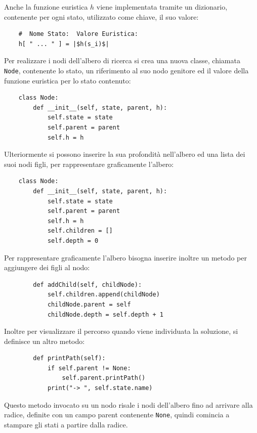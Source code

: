 \documentclass{article}
\numberwithin{equation}{subsection}
\begin{document}
Anche la funzione euristica $h$ viene implementata tramite un dizionario, contenente per ogni 
stato, utilizzato come chiave, il suo valore:
\begin{verbatim}
    #  Nome Stato:  Valore Euristica:
    h[ " ... " ] = |$h(s_i)$|
\end{verbatim}

Per realizzare i nodi dell'albero di ricerca si crea una nuova classe, chiamata \verb|Node|, 
contenente lo stato, un riferimento 
al suo nodo genitore ed il valore della funzione euristica per lo stato contenuto:
\begin{verbatim}
    class Node:
        def __init__(self, state, parent, h):
            self.state = state
            self.parent = parent
            self.h = h
\end{verbatim}

Ulteriormente si possono inserire la sua profondità nell'albero ed una lista dei suoi nodi figli, 
per rappresentare graficamente l'albero:
\begin{verbatim}
    class Node:
        def __init__(self, state, parent, h):
            self.state = state
            self.parent = parent
            self.h = h
            self.children = []
            self.depth = 0
\end{verbatim}

Per rappresentare graficamente l'albero bisogna inserire inoltre un metodo per aggiungere 
dei figli al nodo:
\begin{verbatim}
        def addChild(self, childNode):
            self.children.append(childNode)
            childNode.parent = self
            childNode.depth = self.depth + 1
\end{verbatim}

Inoltre per visualizzare il percorso quando viene individuata la soluzione, si definisce 
un altro metodo:
\begin{verbatim}
        def printPath(self):
            if self.parent != None:
                self.parent.printPath()
            print("-> ", self.state.name)
\end{verbatim}

Questo metodo invocato su un nodo risale i nodi dell'albero fino ad arrivare alla radice, 
definite con un campo parent contenente \verb|None|, quindi comincia a stampare gli 
stati a partire dalla radice. 
\end{document}
